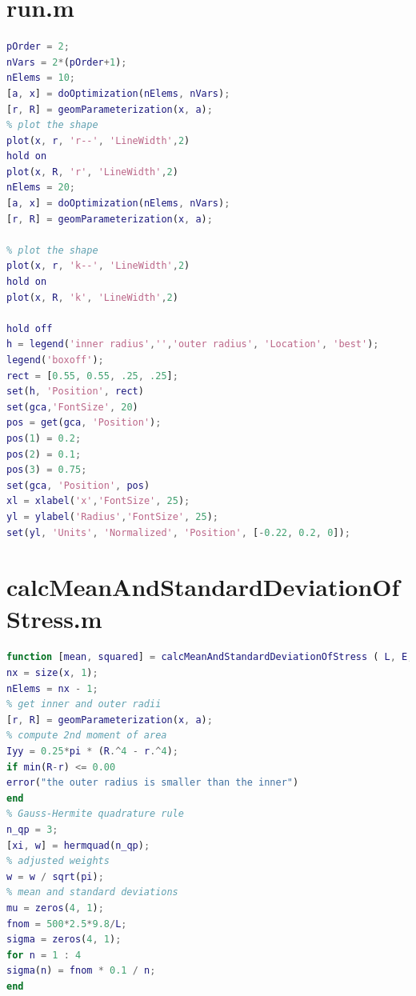 \documentclass[a4paper]{article}
\begin{document}
\begin{appendices}
\section{run.m}\label{app:run}
\begin{lstlisting}[language=Matlab]
pOrder = 2;
nVars = 2*(pOrder+1);
nElems = 10;
[a, x] = doOptimization(nElems, nVars);
[r, R] = geomParameterization(x, a);
% plot the shape
plot(x, r, 'r--', 'LineWidth',2)
hold on
plot(x, R, 'r', 'LineWidth',2)
nElems = 20;
[a, x] = doOptimization(nElems, nVars);
[r, R] = geomParameterization(x, a);

% plot the shape
plot(x, r, 'k--', 'LineWidth',2)
hold on
plot(x, R, 'k', 'LineWidth',2)

hold off
h = legend('inner radius','','outer radius', 'Location', 'best');
legend('boxoff');
rect = [0.55, 0.55, .25, .25];
set(h, 'Position', rect)
set(gca,'FontSize', 20)
pos = get(gca, 'Position');
pos(1) = 0.2;
pos(2) = 0.1;
pos(3) = 0.75;
set(gca, 'Position', pos)
xl = xlabel('x','FontSize', 25);
yl = ylabel('Radius','FontSize', 25);
set(yl, 'Units', 'Normalized', 'Position', [-0.22, 0.2, 0]);
\end{lstlisting} 

\section{calcMeanAndStandardDeviationOfStress.m}\label{app:new_const}
\begin{lstlisting}[language=Matlab]
function [mean, squared] = calcMeanAndStandardDeviationOfStress ( L, E, force, x, a )
nx = size(x, 1);
nElems = nx - 1;
% get inner and outer radii
[r, R] = geomParameterization(x, a);
% compute 2nd moment of area
Iyy = 0.25*pi * (R.^4 - r.^4);
if min(R-r) <= 0.00
error("the outer radius is smaller than the inner")
end
% Gauss-Hermite quadrature rule
n_qp = 3;
[xi, w] = hermquad(n_qp);
% adjusted weights
w = w / sqrt(pi);
% mean and standard deviations
mu = zeros(4, 1);
fnom = 500*2.5*9.8/L;
sigma = zeros(4, 1);
for n = 1 : 4
sigma(n) = fnom * 0.1 / n;
end


\end{lstlisting}
\end{appendices}
\end{document}
